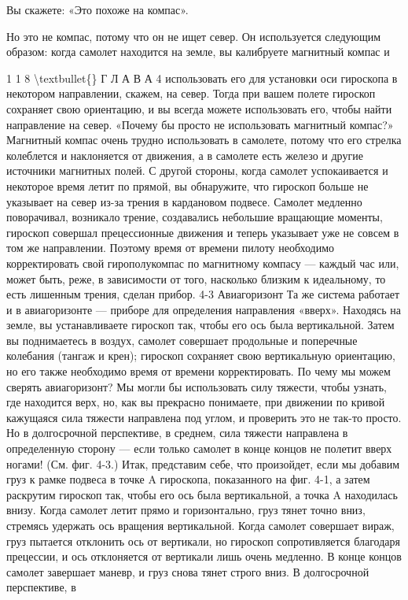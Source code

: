\documentclass[10pt,oneside]{article}
\newcommand{\TipsSubsection}[1]{\par\vspace{6bp}{\normalsize\bfseries #1\par}\vspace{2bp}}
\begin{document}
\TipsSubsection{4-2 Курсовой гироскоп Я начну с простейшего возможного применения гироскопа: если он находится в самолете, который меняет курс, ось вращения гироскопа --- установленная, например, горизонтально --- продолжает указывать в одном и том же направлении. Это очень полезно: при любых эволюциях самолета вы можете сохранять направление --- такой прибор называют курсовым гироскопом (см. рис. 4-2).}

Вы скажете: «Это похоже на компас».\par

Но это не компас, потому что он не ищет север. Он используется следующим образом: когда самолет находится на земле, вы калибруете магнитный компас и\par

1 1 8 \textbackslash{}textbullet\{\} Г Л А В А  4 использовать его для установки оси гироскопа в некотором направлении, скажем, на север. Тогда при вашем полете гироскоп сохраняет свою ориентацию, и вы всегда можете использовать его, чтобы найти направление на север. «Почему бы просто не использовать магнитный компас?» Магнитный компас очень трудно использовать в самолете, потому что его стрелка колеблется и наклоняется от движения, а в самолете есть железо и другие источники магнитных полей. С другой стороны, когда самолет успокаивается и некоторое время летит по прямой, вы обнаружите, что гироскоп больше не указывает на север из-за трения в кардановом подвесе. Самолет медленно поворачивал, возникало трение, создавались небольшие вращающие моменты, гироскоп совершал прецессионные движения и теперь указывает уже не совсем в том же направлении. Поэтому время от времени пилоту необходимо корректировать свой гирополукомпас по магнитному компасу --- каждый час или, может быть, реже, в зависимости от того, насколько близким к идеальному, то есть лишенным трения, сделан прибор. 4-3 Авиагоризонт Та же система работает и в авиагоризонте --- приборе для определения направления «вверх». Находясь на земле, вы устанавливаете гироскоп так, чтобы его ось была вертикальной. Затем вы поднимаетесь в воздух, самолет совершает продольные и поперечные колебания (тангаж и крен); гироскоп сохраняет свою вертикальную ориентацию, но его также необходимо время от времени корректировать. По чему мы можем сверять авиагоризонт? Мы могли бы использовать силу тяжести, чтобы узнать, где находится верх, но, как вы прекрасно понимаете, при движении по кривой кажущаяся сила тяжести направлена под углом, и проверить это не так-то просто. Но в долгосрочной перспективе, в среднем, сила тяжести направлена в определенную сторону --- если только самолет в конце концов не полетит вверх ногами! (См. фиг. 4-3.) Итак, представим себе, что произойдет, если мы добавим груз к рамке подвеса в точке A гироскопа, показанного на фиг. 4-1, а затем раскрутим гироскоп так, чтобы его ось была вертикальной, а точка A находилась внизу. Когда самолет летит прямо и горизонтально, груз тянет точно вниз, стремясь удержать ось вращения вертикальной. Когда самолет совершает вираж, груз пытается отклонить ось от вертикали, но гироскоп сопротивляется благодаря прецессии, и ось отклоняется от вертикали лишь очень медленно. В конце концов самолет завершает маневр, и груз снова тянет строго вниз. В долгосрочной перспективе, в 
\end{document}
